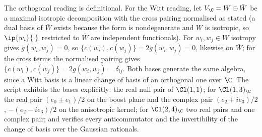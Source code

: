 The orthogonal reading is definitional. For the Witt reading, let $V_{\C} = W \oplus \bar{W}$ be a maximal isotropic decomposition with the cross pairing normalised as stated (a dual basis of $\bar{W}$ exists because the form is nondegenerate and $W$ is isotropic, so $\ip{w_{i}}{\cdot}$ restricted to $\bar{W}$ are independent functionals). For $w_{i}, w_{j} \in W$ isotropy gives $g(w_{i}, w_{j}) = 0$, so $\{c(w_{i}), c(w_{j})\} = 2g(w_{i}, w_{j}) = 0$, likewise on $\bar{W}$; for the cross terms the normalised pairing gives $\{c(w_{i}), c(\bar{w}_{j})\} = 2g(w_{i}, \bar{w}_{j}) = \delta_{ij}$. Both bases generate the same algebra, since a Witt basis is a linear change of basis of an orthogonal one over $\C$. The script exhibits the bases explicitly: the real null pair of $\Cl(1,1)$; for $\Cl(1,3)_{\C}$ the real pair $(e_{0} \pm e_{1})/2$ on the boost plane and the complex pair $(e_{2} + ie_{3})/2$, $-(e_{2} - ie_{3})/2$ on the anisotropic kernel; for $\Cl(2,4)_{\C}$ two real pairs and one complex pair; and verifies every anticommutator and the invertibility of the change of basis over the Gaussian rationals.

